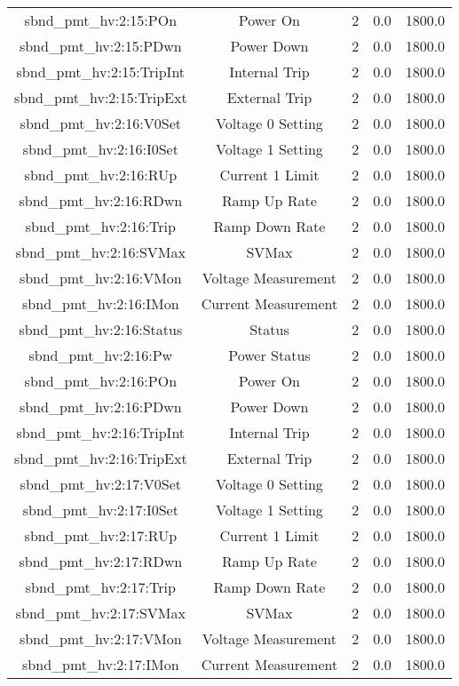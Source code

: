 \begin{center}
\begin{longtable}{c | c c c c }
sbnd\_pmt\_hv:2:15:POn & Power On & 2 & 0.0 & 1800.0\\ 
sbnd\_pmt\_hv:2:15:PDwn & Power Down & 2 & 0.0 & 1800.0\\ 
sbnd\_pmt\_hv:2:15:TripInt & Internal Trip & 2 & 0.0 & 1800.0\\ 
sbnd\_pmt\_hv:2:15:TripExt & External Trip & 2 & 0.0 & 1800.0\\ 
sbnd\_pmt\_hv:2:16:V0Set & Voltage 0 Setting & 2 & 0.0 & 1800.0\\ 
sbnd\_pmt\_hv:2:16:I0Set & Voltage 1 Setting & 2 & 0.0 & 1800.0\\ 
sbnd\_pmt\_hv:2:16:RUp & Current 1 Limit & 2 & 0.0 & 1800.0\\ 
sbnd\_pmt\_hv:2:16:RDwn & Ramp Up Rate & 2 & 0.0 & 1800.0\\ 
sbnd\_pmt\_hv:2:16:Trip & Ramp Down Rate & 2 & 0.0 & 1800.0\\ 
sbnd\_pmt\_hv:2:16:SVMax & SVMax & 2 & 0.0 & 1800.0\\ 
sbnd\_pmt\_hv:2:16:VMon & Voltage Measurement & 2 & 0.0 & 1800.0\\ 
sbnd\_pmt\_hv:2:16:IMon & Current Measurement & 2 & 0.0 & 1800.0\\ 
sbnd\_pmt\_hv:2:16:Status & Status & 2 & 0.0 & 1800.0\\ 
sbnd\_pmt\_hv:2:16:Pw & Power Status & 2 & 0.0 & 1800.0\\ 
sbnd\_pmt\_hv:2:16:POn & Power On & 2 & 0.0 & 1800.0\\ 
sbnd\_pmt\_hv:2:16:PDwn & Power Down & 2 & 0.0 & 1800.0\\ 
sbnd\_pmt\_hv:2:16:TripInt & Internal Trip & 2 & 0.0 & 1800.0\\ 
sbnd\_pmt\_hv:2:16:TripExt & External Trip & 2 & 0.0 & 1800.0\\ 
sbnd\_pmt\_hv:2:17:V0Set & Voltage 0 Setting & 2 & 0.0 & 1800.0\\ 
sbnd\_pmt\_hv:2:17:I0Set & Voltage 1 Setting & 2 & 0.0 & 1800.0\\ 
sbnd\_pmt\_hv:2:17:RUp & Current 1 Limit & 2 & 0.0 & 1800.0\\ 
sbnd\_pmt\_hv:2:17:RDwn & Ramp Up Rate & 2 & 0.0 & 1800.0\\ 
sbnd\_pmt\_hv:2:17:Trip & Ramp Down Rate & 2 & 0.0 & 1800.0\\ 
sbnd\_pmt\_hv:2:17:SVMax & SVMax & 2 & 0.0 & 1800.0\\ 
sbnd\_pmt\_hv:2:17:VMon & Voltage Measurement & 2 & 0.0 & 1800.0\\ 
sbnd\_pmt\_hv:2:17:IMon & Current Measurement & 2 & 0.0 & 1800.0\\ 

\end{longtable}
\end{center}
